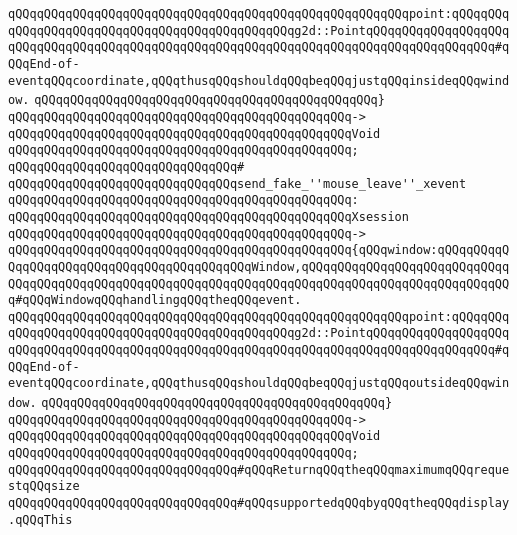 \verb|qQQqqQQqqQQqqQQqqQQqqQQqqQQqqQQqqQQqqQQqqQQqqQQqqQQqqQQqpoint:qQQqqQQqqQQqqQQqqQQqqQQqqQQqqQQqqQQqqQQqqQQqqQQqg2d::PointqQQqqQQqqQQqqQQqqQQqqQQqqQQqqQQqqQQqqQQqqQQqqQQqqQQqqQQqqQQqqQQqqQQqqQQqqQQqqQQqqQQqqQQq#qQQqEnd-of-eventqQQqcoordinate,qQQqthusqQQqshouldqQQqbeqQQqjustqQQqinsideqQQqwindow.|\newline
\verb|qQQqqQQqqQQqqQQqqQQqqQQqqQQqqQQqqQQqqQQqqQQqqQQq}|\newline
\verb|qQQqqQQqqQQqqQQqqQQqqQQqqQQqqQQqqQQqqQQqqQQqqQQq->|\newline
\verb|qQQqqQQqqQQqqQQqqQQqqQQqqQQqqQQqqQQqqQQqqQQqqQQqVoid|\newline
\verb|qQQqqQQqqQQqqQQqqQQqqQQqqQQqqQQqqQQqqQQqqQQqqQQq;|\newline
\verb|qQQqqQQqqQQqqQQqqQQqqQQqqQQqqQQq#|\newline
\verb|qQQqqQQqqQQqqQQqqQQqqQQqqQQqqQQqsend_fake_''mouse_leave''_xevent|\newline
\verb|qQQqqQQqqQQqqQQqqQQqqQQqqQQqqQQqqQQqqQQqqQQqqQQq:|\newline
\verb|qQQqqQQqqQQqqQQqqQQqqQQqqQQqqQQqqQQqqQQqqQQqqQQqXsession|\newline
\verb|qQQqqQQqqQQqqQQqqQQqqQQqqQQqqQQqqQQqqQQqqQQqqQQq->|\newline
\verb|qQQqqQQqqQQqqQQqqQQqqQQqqQQqqQQqqQQqqQQqqQQqqQQq{qQQqwindow:qQQqqQQqqQQqqQQqqQQqqQQqqQQqqQQqqQQqqQQqqQQqWindow,qQQqqQQqqQQqqQQqqQQqqQQqqQQqqQQqqQQqqQQqqQQqqQQqqQQqqQQqqQQqqQQqqQQqqQQqqQQqqQQqqQQqqQQqqQQqqQQqqQQq#qQQqWindowqQQqhandlingqQQqtheqQQqevent.|\newline
\verb|qQQqqQQqqQQqqQQqqQQqqQQqqQQqqQQqqQQqqQQqqQQqqQQqqQQqqQQqpoint:qQQqqQQqqQQqqQQqqQQqqQQqqQQqqQQqqQQqqQQqqQQqqQQqg2d::PointqQQqqQQqqQQqqQQqqQQqqQQqqQQqqQQqqQQqqQQqqQQqqQQqqQQqqQQqqQQqqQQqqQQqqQQqqQQqqQQqqQQqqQQq#qQQqEnd-of-eventqQQqcoordinate,qQQqthusqQQqshouldqQQqbeqQQqjustqQQqoutsideqQQqwindow.|\newline
\verb|qQQqqQQqqQQqqQQqqQQqqQQqqQQqqQQqqQQqqQQqqQQqqQQq}|\newline
\verb|qQQqqQQqqQQqqQQqqQQqqQQqqQQqqQQqqQQqqQQqqQQqqQQq->|\newline
\verb|qQQqqQQqqQQqqQQqqQQqqQQqqQQqqQQqqQQqqQQqqQQqqQQqVoid|\newline
\verb|qQQqqQQqqQQqqQQqqQQqqQQqqQQqqQQqqQQqqQQqqQQqqQQq;|\newline
\newline
\verb|qQQqqQQqqQQqqQQqqQQqqQQqqQQqqQQq#qQQqReturnqQQqtheqQQqmaximumqQQqrequestqQQqsize|\newline
\verb|qQQqqQQqqQQqqQQqqQQqqQQqqQQqqQQq#qQQqsupportedqQQqbyqQQqtheqQQqdisplay.qQQqThis|\newline
